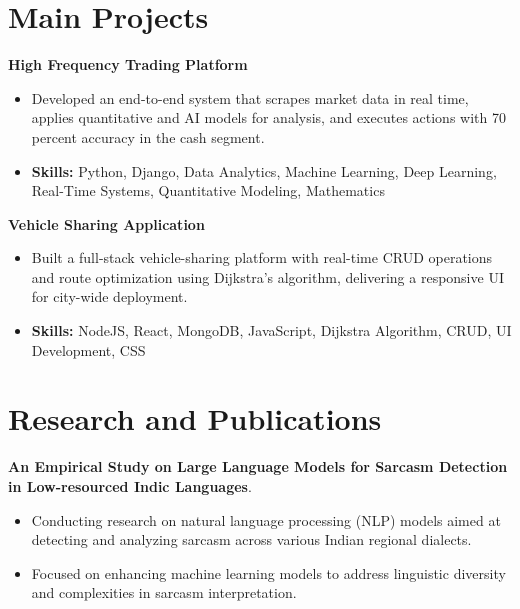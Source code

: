 \documentclass[a4paper,11pt]{article}
\begin{document}
\section{\textbf{Main Projects}}

\vspace{1mm}
  \textbf{High Frequency Trading Platform  }
\vspace{-1.5mm} %
\begin{itemize}
  \item Developed an end-to-end system that scrapes market data in real time, applies quantitative and AI models for analysis, and executes actions with 70 percent accuracy in the cash segment.
\vspace{-3mm}
  \item \textbf{Skills:} Python, Django, Data Analytics, Machine Learning, Deep Learning, Real-Time Systems, Quantitative Modeling, Mathematics
\end{itemize}


\vspace{1mm}
   \textbf{Vehicle Sharing Application }
\vspace{-1.5mm} %
\begin{itemize}
  \item Built a full-stack vehicle-sharing platform with real-time CRUD operations and route optimization using Dijkstra's algorithm, delivering a responsive UI for city-wide deployment.
\vspace{-3mm}
  \item \textbf{Skills:} NodeJS, React, MongoDB, JavaScript, Dijkstra Algorithm, CRUD, UI Development, CSS
\end{itemize}



\section{\textbf{Research and Publications} \hfill }
\vspace{1mm}
  \textbf{An Empirical Study on Large Language Models for Sarcasm Detection in Low-resourced Indic Languages}.
\vspace{-1mm} %
\begin{itemize}
  \item Conducting research on natural language processing (NLP) models aimed at detecting and analyzing sarcasm across various Indian regional dialects.
\vspace{-3mm}
  \item Focused on enhancing machine learning models to address linguistic diversity and complexities in sarcasm interpretation.
\end{itemize}
\end{document}
